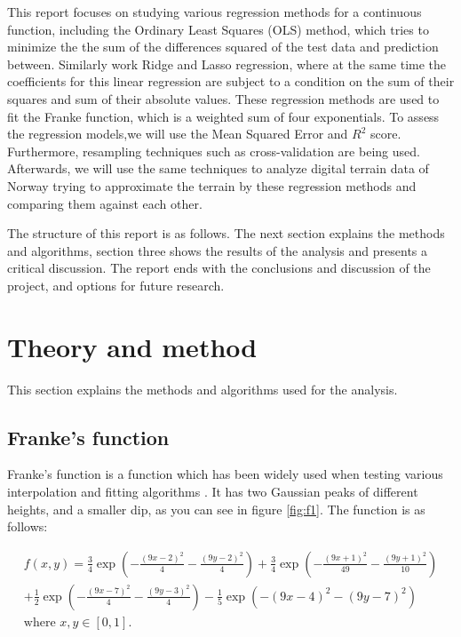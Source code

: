 \documentclass[12pt]{extarticle}
\begin{document}
This report focuses on studying various regression methods for a continuous function, including the Ordinary Least Squares (OLS) method, which tries to minimize the the sum of the differences squared of the test data and prediction between. Similarly work Ridge and Lasso regression, where at the same time the coefficients for this linear regression are subject to a condition on the sum of their squares and sum of their absolute values. These regression methods are used to fit the Franke function, which is a weighted sum of four exponentials. To assess the regression models,we will use the Mean Squared Error and $R^2$ score. Furthermore, resampling techniques such as cross-validation are being used. Afterwards, we will use the same techniques to analyze digital terrain data of Norway trying to approximate the terrain by these regression methods and comparing them against each other.


The structure of this report is as follows. The next section explains the methods and algorithms, section three shows the results of the analysis and presents a critical discussion. The report ends with the conclusions and discussion of the project, and options for future research.

\section{Theory and method}

This section explains the methods and algorithms used for the analysis. 

\subsection{Franke's function}

Franke’s function is a function which has been widely used when testing various interpolation and fitting algorithms \cite{lec}. It has two Gaussian peaks of different heights, and a smaller dip, as you can see in figure \ref{fig:f1}. The function is as follows:

\begin{equation*}
\begin{aligned}
f(x, y) = \frac{3}{4} \exp\left(-\frac{(9x-2)^2}{4}-\frac{(9y-2)^2}{4}\right) + \frac{3}{4} \exp\left(-\frac{(9x+1)^2}{49}-\frac{(9y+1)^2}{10}\right)\\
+\frac{1}{2} \exp\left(-\frac{(9x-7)^2}{4}-\frac{(9y-3)^2}{4}\right) - \frac{1}{5} \exp\left(-(9x-4)^2-(9y-7)^2\right)\\
\text{where } x, y \in [0,1].
\end{aligned}
\end{equation*}
\end{document}
